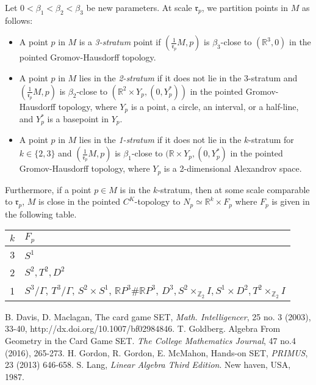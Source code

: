 \documentclass[ma493]{swumath}
\begin{document}
Let $0 < \beta_1 < \beta_2 < \beta_3$ be new parameters. 
At scale $\mathfrak{r}_p$, we partition points in $M$ as follows:
\begin{itemize}
\item A point $p$ in $M$ is a \emph{3-stratum} point if $(\frac{1}{\mathfrak{r}_p} M, p)$ is $\beta_3$-close to $(\mathbb{R}^3, 0)$ in the pointed Gromov-Hausdorff topology.
\item A point $p$ in $M$ lies in the \emph{2-stratum} if it does not lie in the 3-stratum and $(\frac{1}{\mathfrak{r}_p} M, p)$ is $\beta_2$-close to $(\mathbb{R}^2 \times Y_p, (0, Y^*_p))$ in the pointed Gromov-Hausdorff topology, where
$Y_p$ is a point, a circle, an interval, or a half-line, and $Y^*_p$ is a basepoint in $Y_p$.
\item A point $p$ in $M$ lies in the \emph{1-stratum} if it does not lie in the $k$-stratum for $k \in \{2,3\}$ and 
$(\frac{1}{\mathfrak{r}_p} M, p)$ is $\beta_1$-close to $(\mathbb{R} \times Y_p, (0, Y^*_p)$ in the pointed Gromov-Hausdorff topology, where
$Y_p$ is a 2-dimensional Alexandrov space.
\end{itemize}

Furthermore, if a point $p \in M$ is in the $k$-stratum, then 
at some scale comparable to $\mathfrak{r}_p$, $M$ is 
close in the pointed $C^K$-topology to $N_p \simeq \mathbb{R}^k \times F_p$ where $F_p$ is given in the following table.

\begin{center}
\begin{tabular}{|c|l|} 
\hline
$k$ & $F_p$ \\ \hline
3 & $S^1$ \\ \hline
2 & $S^2, T^2, D^2$ \\ \hline
1 & $S^3/\Gamma$, $T^3/\Gamma$, $S^2 \times S^1$, $\mathbb{R}P^3 \# \mathbb{R}P^3$,
$D^3, S^2 \times_{\mathbb{Z}_2} I, S^1 \times D^2, T^2 \times_{\mathbb{Z}_2} I$ \\ \hline
\end{tabular}
\end{center}

\begin{thebibliography}{20}
 B. Davis, D. Maclagan, The card game SET, \emph{Math. Intelligencer}, 25 no. 3 (2003), 33-40, http://dx.doi.org/10.1007/bf02984846.
 T. Goldberg. Algebra From Geometry in the Card Game SET. \emph{The College Mathematics Journal}, 47 no.4 (2016), 265-273.
 H. Gordon, R. Gordon, E. McMahon, Hands-on SET, \emph{PRIMUS}, 23 (2013) 646-658.  
 S. Lang, \emph{Linear Algebra Third Edition}. New haven, USA, 1987.
\end{thebibliography}
\end{document}

